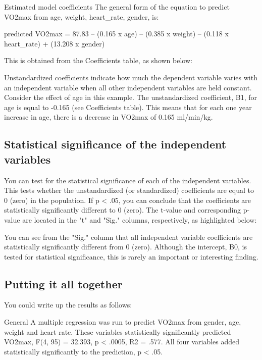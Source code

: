 \documentclass[]{article}
\begin{document}
		
		
		Estimated model coefficients
		The general form of the equation to predict VO2max from age, weight, heart\_rate, gender, is:
		
		predicted VO2max = 87.83 – (0.165 x age) – (0.385 x weight) – (0.118 x heart\_rate) + (13.208 x gender)
		
		This is obtained from the Coefficients table, as shown below:
		
		
		Unstandardized coefficients indicate how much the dependent variable varies with an independent variable when all other independent variables are held constant. Consider the effect of age in this example. The unstandardized coefficient, B1, for age is equal to -0.165 (see Coefficients table). This means that for each one year increase in age, there is a decrease in VO2max of 0.165 ml/min/kg.
		
		\subsection{Statistical significance of the independent variables}
		You can test for the statistical significance of each of the independent variables. This tests whether the unstandardized (or standardized) coefficients are equal to 0 (zero) in the population. If p < .05, you can conclude that the coefficients are statistically significantly different to 0 (zero). The t-value and corresponding p-value are located in the "t" and "Sig." columns, respectively, as highlighted below:
		
		You can see from the "Sig." column that all independent variable coefficients are statistically significantly different from 0 (zero). Although the intercept, B0, is tested for statistical significance, this is rarely an important or interesting finding.
		
		\subsection{Putting it all together}
		You could write up the results as follows:
		
		General
		A multiple regression was run to predict VO2max from gender, age, weight and heart rate. These variables statistically significantly predicted VO2max, F(4, 95) = 32.393, p < .0005, R2 = .577. All four variables added statistically significantly to the prediction, p < .05.
		
\end{document}
